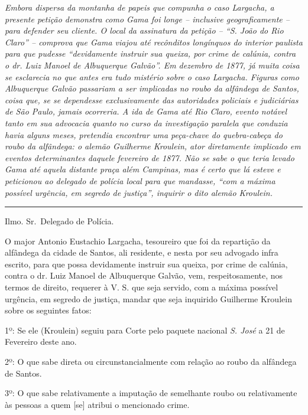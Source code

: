 \emph{Embora dispersa da montanha de papeis que compunha o caso
Largacha, a presente petição demonstra como Gama foi longe -- inclusive
geograficamente -- para defender seu cliente. O local da assinatura da
petição -- ``S. João do Rio Claro'' -- comprova que Gama viajou até
recônditos longínquos do interior paulista para que pudesse
``devidamente instruir sua queixa, por crime de calúnia, contra o dr.
Luiz Manoel de Albuquerque Galvão''. Em dezembro de 1877, já muita coisa
se esclarecia no que antes era tudo mistério sobre o caso Largacha.
Figuras como Albuquerque Galvão passariam a ser implicadas no roubo da
alfândega de Santos, coisa que, se se dependesse exclusivamente das
autoridades policiais e judiciárias de São Paulo, jamais ocorreria. A
ida de Gama até Rio Claro, evento notável tanto em sua advocacia quanto
no curso da investigação paralela que conduzia havia alguns meses,
pretendia encontrar uma peça-chave do quebra-cabeça do roubo da
alfândega: o alemão Guilherme Kroulein, ator diretamente implicado em
eventos determinantes daquele fevereiro de 1877. Não se sabe o que teria
levado Gama até aquela distante praça além Campinas, mas é certo que lá
esteve e peticionou ao delegado de polícia local para que mandasse,
``com a máxima possível urgência, em segredo de justiça'', inquirir o
dito alemão Kroulein. }

\begin{center}\rule{0.5\linewidth}{\linethickness}\end{center}

Ilmo. Sr.~Delegado de Polícia.

O major Antonio Eustachio Largacha, tesoureiro que foi da repartição da
alfândega da cidade de Santos, ali residente, e nesta por seu advogado
infra escrito, para que possa devidamente instruir sua queixa, por crime
de calúnia, contra o dr. Luiz Manoel de Albuquerque Galvão, vem,
respeitosamente, nos termos de direito, requerer à V. S. que seja
servido, com a máxima possível urgência, em segredo de justiça, mandar
que seja inquirido Guilherme Kroulein sobre os seguintes fatos:

1º: Se ele (Kroulein) seguiu para Corte pelo paquete nacional \emph{S.
José} a 21 de Fevereiro deste ano.

2º: O que sabe direta ou circunstancialmente com relação ao roubo da
alfândega de Santos.

3º: O que sabe relativamente a imputação de semelhante roubo ou
relativamente às pessoas a quem {[}se{]} atribui o mencionado crime.

